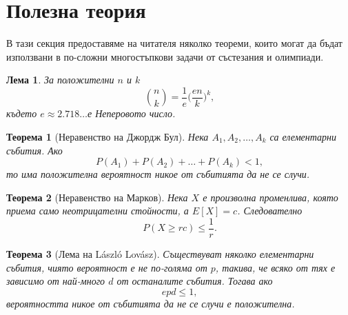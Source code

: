 \documentclass[11 pt, a4paper]{article}
\newtheorem{thm}{Теорема}
\newtheorem{lm}{Лема}
\theoremstyle{definition}
\theoremstyle{remark}
\begin{document}
\section{Полезна теория}
В тази секция предоставяме на читателя няколко теореми, които могат да бъдат използвани в по-сложни многостъпкови задачи от състезания и олимпиади.
\begin{lm}
За положителни $n$ и $k$
\begin{equation*}
{{n}\choose{k}}={\dfrac{1}{e}}\bigg(\dfrac{en}{k}\bigg)^k,
\end{equation*}
където $e\approx2.718\dots$е Неперовото число.
\end{lm}
\begin{thm}[Неравенство на Джордж Бул]
Нека $A_1, A_2,\dots,A_k$ са елементарни събития. Ако
\begin{equation*}
P(A_1)+P(A_2)+\dots+P(A_k)<1,
\end{equation*}
то има положителна вероятност никое от събитията да не се случи.
\end{thm}
\begin{thm}[Неравенство на Марков]
Нека $X$ е произволна променлива, която приема само неотрицателни стойности, а $E[X]=c$.  Следователно
\begin{equation*}
P(X\geq rc)\leq \dfrac{1}{r}.
\end{equation*}
\end{thm}
\begin{thm}[Лема на László Lovász]
Съществуват няколко елементарни събития, чиято вероятност е не по-голяма от $p$, такива, че всяко от тях е зависимо от най-много $d$ от останалите събития. Тогава ако
\begin{equation*}
epd\leq1,
\end{equation*}
 вероятността никое от събитията да не се случи е положителна.
\end{thm}
\end{document}
